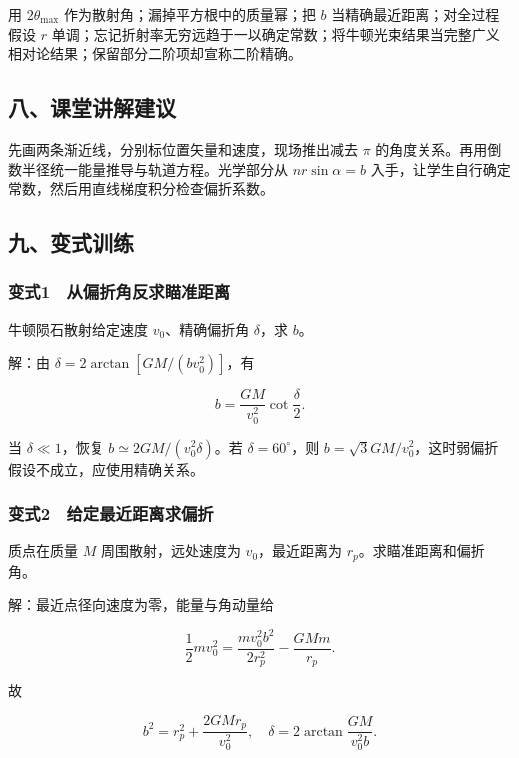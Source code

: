 \documentclass[12pt,a4paper,fontset=fandol]{ctexart}
\begin{document}
用 \(2\theta_{\max}\) 作为散射角；漏掉平方根中的质量幂；把 \(b\)
当精确最近距离；对全过程假设 \(r\)
单调；忘记折射率无穷远趋于一以确定常数；将牛顿光束结果当完整广义相对论结果；保留部分二阶项却宣称二阶精确。

\subsection{八、课堂讲解建议}\label{ux516bux8bfeux5802ux8bb2ux89e3ux5efaux8bae-5}

先画两条渐近线，分别标位置矢量和速度，现场推出减去 \(\pi\)
的角度关系。再用倒数半径统一能量推导与轨道方程。光学部分从
\(nr\sin\alpha=b\)
入手，让学生自行确定常数，然后用直线梯度积分检查偏折系数。

\subsection{九、变式训练}\label{ux4e5dux53d8ux5f0fux8badux7ec3-5}

\subsubsection{变式1　从偏折角反求瞄准距离}\label{ux53d8ux5f0f1-ux4eceux504fux6298ux89d2ux53cdux6c42ux7784ux51c6ux8dddux79bb}

牛顿陨石散射给定速度 \(v_0\)、精确偏折角 \(\delta\)，求 \(b\)。

解：由 \(\delta=2\arctan[GM/(bv_0^2)]\)，有

\[\boxed{b=\frac{GM}{v_0^2}\cot\frac\delta2.}\]

当 \(\delta\ll1\)，恢复 \(b\simeq2GM/(v_0^2\delta)\)。若
\(\delta=60^\circ\)，则
\(b=\sqrt3GM/v_0^2\)，这时弱偏折假设不成立，应使用精确关系。

\subsubsection{变式2　给定最近距离求偏折}\label{ux53d8ux5f0f2-ux7ed9ux5b9aux6700ux8fd1ux8dddux79bbux6c42ux504fux6298}

质点在质量 \(M\) 周围散射，远处速度为 \(v_0\)，最近距离为
\(r_p\)。求瞄准距离和偏折角。

解：最近点径向速度为零，能量与角动量给

\[\frac12mv_0^2=\frac{m v_0^2b^2}{2r_p^2}-\frac{GMm}{r_p}.\]

故

\[\boxed{b^2=r_p^2+\frac{2GM r_p}{v_0^2},
\quad\delta=2\arctan\frac{GM}{v_0^2b}.}\]
\end{document}
